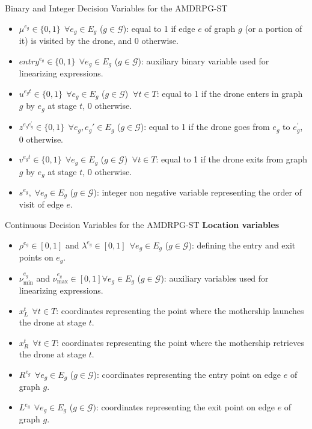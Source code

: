 \documentclass[slidestop,usepdftitle=false,10pt]{beamer}
\begin{document}
	\begin{frame}{Binary and Integer Decision Variables for the AMDRPG-ST}
	\begin{itemize}
	    \item $\mu^{e_g} \in \{0,1\} \:\: \forall e_g \in E_g$ ($g \in \mathcal{G}$): equal to 1 if edge $e$ of graph $g$ (or a portion of it) is visited by the drone, and  0 otherwise.
        \item $entry^{e_g} \in \{0,1\} \:\: \forall e_g \in E_g$ ($g \in \mathcal{G}$): auxiliary binary variable used for linearizing expressions.
        \item $u^{e_{g}t} \in \{0,1\} \:\: \forall e_g \in E_g$ ($g \in \mathcal{G}$) $\: \forall t \in T$: equal to 1 if the drone enters in graph $g$ by $e_g$ at stage $t$, 0 otherwise.
        \item $z^{e_{g}e^{'}_{g}} \in \{0,1\} \:\: \forall e_g, e_g' \in E_g$ ($g \in \mathcal{G}$): equal to 1 if the drone goes from $e_g$ to $e^{'}_{g}$, 0 otherwise.
        \item $v^{e_{g}t} \in \{0,1\} \:\: \forall e_g \in E_g$ ($g \in \mathcal{G}$) $\: \forall t \in T$: equal to 1 if the drone exits from graph $g$ by $e_g$ at stage $t$, 0 otherwise.
        \item $s^{e_g},\; \forall e_g \in E_g$ ($g \in \mathcal{G}$): integer non negative variable representing the order of visit of edge $e$.
    \end{itemize}
	\end{frame}
	
	\begin{frame}{Continuous Decision Variables for the AMDRPG-ST}
	\textbf{Location variables}
	\begin{itemize}
	    \item $\rho^{e_g} \in [0,1]$ and $\lambda^{e_g} \in [0,1] \:\: \forall e_g \in E_g$ ($g \in \mathcal{G}$): defining the entry and exit points on $e_g$.
        \item $\nu_\text{min}^{e_g}$ and $\nu_\text{max}^{e_g} \in [0,1] \forall e_g \in E_g$ ($g \in \mathcal{G}$): auxiliary variables used for linearizing expressions.
        \item $x_L^t \:\: \forall t \in T$: coordinates representing the point where the mothership launches the drone at stage $t$.
        \item $x_R^t \:\: \forall t \in T$: coordinates representing the point where the mothership retrieves the drone at stage $t$.
        \item $R^{e_g} \:\: \forall e_g \in E_g$ ($g \in \mathcal{G}$): coordinates representing the entry point on edge $e$ of graph $g$.
        \item $L^{e_g} \:\: \forall e_g \in E_g$ ($g \in \mathcal{G})$: coordinates representing the exit point on edge $e$ of graph $g$.
    \end{itemize}
    \end{frame}
    
\end{document}
